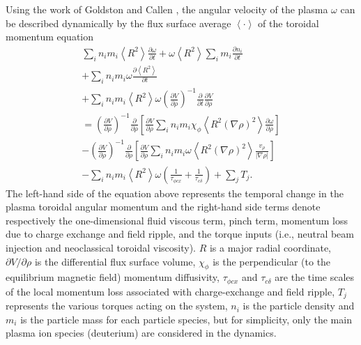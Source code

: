 \documentclass{iopart}
\begin{document}
Using the work of Goldston \cite{Goldston86}  and Callen  \cite{Callen09}, the angular velocity of the plasma $\omega$ can be described dynamically by the flux surface average $\left<\cdot\right>$ of the toroidal momentum equation 
\begin{multline}
  \sum_i n_i m_i \left<R^2\right> \frac{\partial \omega}{\partial t}
  + \omega \left<R^2\right> \sum_i m_i \frac{\partial n_i}{\partial t} \\
  + \sum_i n_i m_i \omega \frac{\partial \left<R^2\right>}{\partial t} \\
  + \sum_i n_i m_i \left<R^2\right> \omega \left( \frac{\partial V}{\partial\rho}\right)^{-1} \frac{\partial}{\partial t} \frac{\partial V}{\partial \rho} \\
  = \left( \frac{\partial V}{\partial\rho}\right)^{-1}\frac{\partial}{\partial \rho} \left[\frac{\partial V}{\partial \rho}\sum_i n_i m_i \chi_\phi \left< R^2 (\nabla \rho)^2\right> \frac{\partial\omega}{\partial\rho}\right] \\
  - \left( \frac{\partial V}{\partial\rho}\right)^{-1}\frac{\partial}{\partial \rho} \left[\frac{\partial V}{\partial \rho}\sum_i n_i m_i \omega \left< R^2 (\nabla \rho)^2\right> \frac{v_\rho}{|\nabla\rho|}\right] \\
  - \sum_i n_i m_i \left< R^2\right> \omega \left( \frac{1}{\tau_{\phi cx}} + \frac{1}{\tau_{c\delta}}\right) + \sum_j T_j.
	\label{eq:full1}
\end{multline}
The left-hand side of the equation above represents the temporal change in the plasma toroidal angular momentum and the right-hand side terms denote respectively the one-dimensional fluid viscous term, pinch term, momentum loss due to charge exchange and field ripple, and the torque inputs (i.e., neutral beam injection and neoclassical toroidal viscosity). $R$ is a major radial coordinate, $\partial V/\partial\rho$ is the differential flux surface volume, $\chi_\phi$ is the perpendicular (to the equilibrium magnetic field) momentum diffusivity, $\tau_{\phi c x}$ and $\tau_{c\delta}$ are the time scales of the local momentum loss associated with charge-exchange and field ripple, $T_j$ represents the various torques acting on the system, $n_i$ is the particle density and $m_i$ is the particle mass for each particle species, but for simplicity, only the main plasma ion species (deuterium) are considered in the dynamics.
\end{document}
